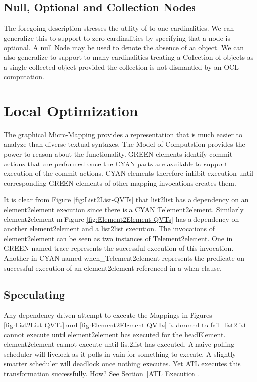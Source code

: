 \documentclass[conference]{IEEEtran}
\begin{document}
\subsection{Null, Optional and Collection Nodes}

The foregoing description stresses the utility of to-one cardinalities. We can generalize this to support to-zero cardinalities by specifying that a node is optional. A null Node may be used to denote the absence of an object. We can also generalize to support to-many cardinalities treating a Collection of objects as a single collected object provided the collection is not dismantled by an OCL computation.

\section{Local Optimization}\label{Local Optimization}

The graphical Micro-Mapping provides a representation that is much easier to analyze than diverse textual syntaxes. The Model of Computation provides the power to reason about the functionality. GREEN elements identify commit-actions that are performed once the CYAN parts are available to support execution of the commit-actions. CYAN elements therefore inhibit execution until corresponding GREEN elements of other mapping invocations creates them.%

It is clear from Figure \ref{fig:List2List-QVTs} that list2list has a dependency on  an element2element execution since there is a CYAN Telement2element. Similarly element2element  in Figure \ref{fig:Element2Element-QVTs} has a dependency on another element2element and a list2list execution. The invocations of element2element can be seen as two instances of Telement2element. One in GREEN named trace represents the successful execution of this invocation. Another in CYAN named when\_Telement2element  represents the predicate on successful execution of an element2element referenced in a when clause.

\subsection{Speculating}

Any dependency-driven attempt to execute the Mappings in Figures \ref{fig:List2List-QVTs} and \ref{fig:Element2Element-QVTs} is doomed to fail. list2list cannot execute until element2element has executed for the headElement. element2element cannot execute until list2list has executed. A naive polling scheduler will livelock as it polls in vain for something to execute. A slightly smarter scheduler will deadlock once nothing executes. Yet ATL executes this transformation successfully. How? See Section~\ref{ATL Execution}.
\end{document}
